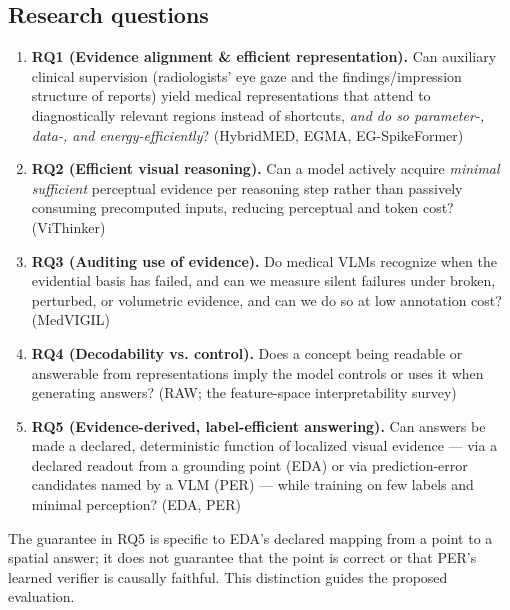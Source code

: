 \subsection{Research questions}
\begin{enumerate}
\item \textbf{RQ1 (Evidence alignment \& efficient representation).} Can auxiliary clinical supervision (radiologists' eye gaze and the findings/impression structure of reports) yield medical representations that attend to diagnostically relevant regions instead of shortcuts, \emph{and do so parameter-, data-, and energy-efficiently}? (HybridMED, EGMA, EG-SpikeFormer)
\item \textbf{RQ2 (Efficient visual reasoning).} Can a model actively acquire \emph{minimal sufficient} perceptual evidence per reasoning step rather than passively consuming precomputed inputs, reducing perceptual and token cost? (ViThinker)
\item \textbf{RQ3 (Auditing use of evidence).} Do medical VLMs recognize when the evidential basis has failed, and can we measure silent failures under broken, perturbed, or volumetric evidence, and can we do so at low annotation cost? (MedVIGIL)
\item \textbf{RQ4 (Decodability vs. control).} Does a concept being readable or answerable from representations imply the model controls or uses it when generating answers? (RAW; the feature-space interpretability survey)
\item \textbf{RQ5 (Evidence-derived, label-efficient answering).} Can answers be made a declared, deterministic function of localized visual evidence --- via a declared readout from a grounding point (EDA) or via prediction-error candidates named by a VLM (PER) --- while training on few labels and minimal perception? (EDA, PER)
\end{enumerate}
The guarantee in RQ5 is specific to EDA's declared mapping from a point to a spatial answer; it does not guarantee that the point is correct or that PER's learned verifier is causally faithful. This distinction guides the proposed evaluation.

